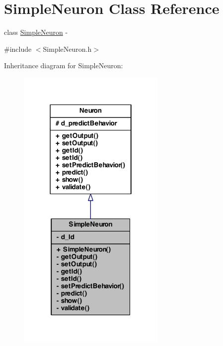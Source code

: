 \hypertarget{class_simple_neuron}{
\section{SimpleNeuron Class Reference}
\label{class_simple_neuron}
}


class \hyperlink{class_simple_neuron}{SimpleNeuron} -\/  




{\ttfamily \#include $<$SimpleNeuron.h$>$}



Inheritance diagram for SimpleNeuron:\nopagebreak
\begin{figure}[H]
\begin{center}
\leavevmode
\includegraphics[width=202pt]{class_simple_neuron__inherit__graph}
\end{center}
\end{figure}


